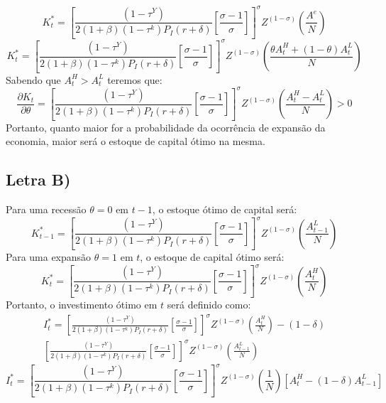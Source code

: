 \documentclass{article}
\begin{document}
\begin{equation}
    K_t^* = \left[\frac{(1-\tau^Y)}{2(1+\beta)(1-\tau^k)P_I(r+\delta)}\left[\frac{\sigma-1}{\sigma}\right]\right]^{\sigma}Z^{(1-\sigma)}\left(\frac{A^{e}}{N}\right)
\end{equation}
\begin{equation}
    K_t^* = \left[\frac{(1-\tau^Y)}{2(1+\beta)(1-\tau^k)P_I(r+\delta)}\left[\frac{\sigma-1}{\sigma}\right]\right]^{\sigma}Z^{(1-\sigma)}\left(\frac{\theta A_{t}^H+(1-\theta)A_{t}^L}{N}\right)
\end{equation}
Sabendo que $A_t^H>A_t^L$ teremos que:
\begin{equation}
    \frac{\partial K_t}{\partial \theta}=\left[\frac{(1-\tau^Y)}{2(1+\beta)(1-\tau^k)P_I(r+\delta)}\left[\frac{\sigma-1}{\sigma}\right]\right]^{\sigma}Z^{(1-\sigma)}\left(\frac{A_{t}^H-A_{t}^L}{N}\right) > 0
\end{equation}
Portanto, quanto maior for a probabilidade da ocorrência de expansão da economia, maior será o estoque de capital ótimo na mesma.
\subsection*{Letra B)}
Para uma recessão $\theta=0$ em $t-1$, o estoque ótimo de capital será:
\begin{equation}
    K_{t-1}^* = \left[\frac{(1-\tau^Y)}{2(1+\beta)(1-\tau^k)P_I(r+\delta)}\left[\frac{\sigma-1}{\sigma}\right]\right]^{\sigma}Z^{(1-\sigma)}\left(\frac{A_{t-1}^L}{N}\right)
\end{equation}
Para uma expansão $\theta=1$ em $t$, o estoque de capital ótimo será:
\begin{equation}
    K_{t}^* = \left[\frac{(1-\tau^Y)}{2(1+\beta)(1-\tau^k)P_I(r+\delta)}\left[\frac{\sigma-1}{\sigma}\right]\right]^{\sigma}Z^{(1-\sigma)}\left(\frac{A_{t}^H}{N}\right)
\end{equation}
Portanto, o investimento ótimo em $t$ será definido como:
\begin{equation}
\begin{split}
    I_t^* = \left[\frac{(1-\tau^Y)}{2(1+\beta)(1-\tau^k)P_I(r+\delta)}\left[\frac{\sigma-1}{\sigma}\right]\right]^{\sigma}Z^{(1-\sigma)}\left(\frac{A_{t}^H}{N}\right) -(1-\delta)\\
    \left[\frac{(1-\tau^Y)}{2(1+\beta)(1-\tau^k)P_I(r+\delta)}\left[\frac{\sigma-1}{\sigma}\right]\right]^{\sigma}Z^{(1-\sigma)}\left(\frac{A_{t-1}^L}{N}\right)
\end{split}
\end{equation}
\begin{equation}
    I_t^*=\left[\frac{(1-\tau^Y)}{2(1+\beta)(1-\tau^k)P_I(r+\delta)}\left[\frac{\sigma-1}{\sigma}\right]\right]^{\sigma}Z^{(1-\sigma)}\left(\frac{1}{N}\right)\left[A_{t}^H-(1-\delta)A_{t-1}^L\right]
\end{equation}
\end{document}
